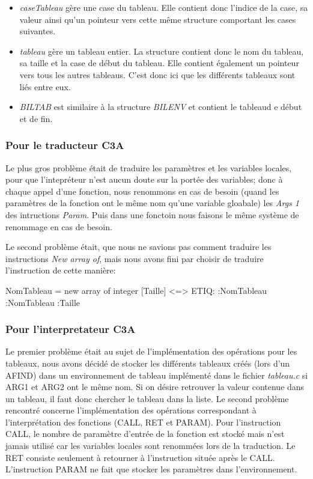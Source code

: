 \documentclass[10pt,a4paper]{article}
\begin{document}
\begin{itemize}
	\item \textit{caseTableau} gère une case du tableau. Elle contient donc l'indice de la case, sa valeur ainsi qu'un pointeur vers cette même structure comportant les cases suivantes.
	\item \textit{tableau} gère un tableau entier. La structure contient donc le nom du tableau, sa taille et la case de début du tableau. Elle contient également un pointeur vers tous les autres tableaus. C'est donc ici que les différents tableaux sont liés entre eux.
	\item \textit{BILTAB} est similaire à la structure \textit{BILENV} et contient le tableaud e début et de fin.
\end{itemize}




\subsubsection{Pour le traducteur C3A}
Le plus gros problème était de traduire les paramètres et les variables locales, pour que l'intepréteur n'est aucun doute sur la portée des variables; donc à chaque appel d'une fonction, nous renommons en cas de besoin (quand les paramètres de la fonction ont le même nom qu'une variable gloabale) les \textit{Args 1} des intructions \textit{Param}. Puis dans une fonctoin nous faisons le même système de renommage en cas de besoin.

Le second problème était, que nous ne savions pas comment traduire les instructions \textit{New array of}, mais nous avons fini par choisir de traduire l'instruction de cette manière:

NomTableau = new array of integer [Taille] <=> ETIQ:   :NomTableau :NomTableau :Taille

\subsubsection{Pour l'interpretateur C3A}
Le premier problème était au sujet de l'implémentation des opérations pour les tableaux, nous avons décidé de stocker les différents tableaux créés (lors d'un AFIND) dans un environnement de tableau implémenté dans le fichier \textit{tableau.c} si ARG1 et ARG2 ont le même nom. Si on désire retrouver la valeur contenue dans un tableau, il faut donc chercher le tableau dans la liste.
Le second problème rencontré concerne l'implémentation des opérations correspondant à l'interprétation des fonctions (CALL, RET et PARAM). Pour l'instruction CALL, le nombre de paramètre d'entrée de la fonction est stocké mais n'est jamais utilisé car les variables locales sont renommées lors de la traduction. Le RET consiste seulement à retourner à l'instruction située après le CALL. L'instruction PARAM ne fait que stocker les paramètres dans l'environnement.
\end{document}
